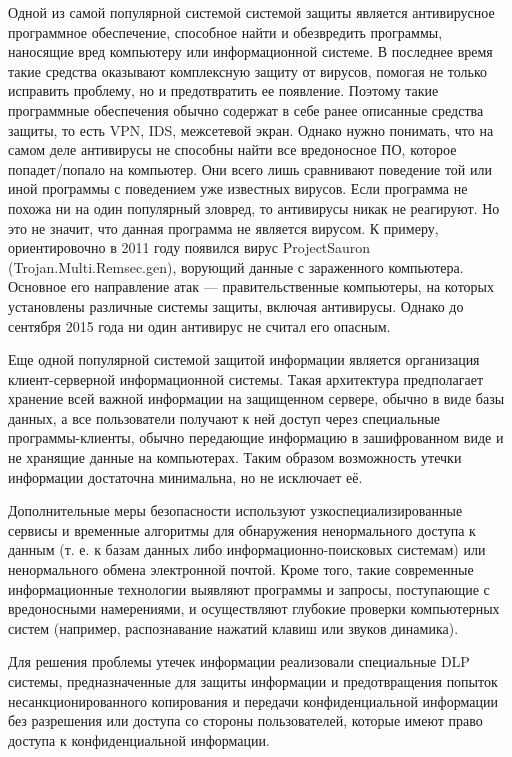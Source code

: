 Одной из самой популярной системой системой защиты является антивирусное программное обеспечение, способное найти и обезвредить программы, наносящие вред компьютеру или информационной системе. В последнее время такие средства оказывают комплексную защиту от вирусов, помогая не только исправить проблему, но и предотвратить ее появление. Поэтому такие программные обеспечения обычно содержат в себе ранее описанные средства защиты, то есть VPN, IDS, межсетевой экран. Однако нужно понимать, что на самом деле антивирусы не способны найти все вредоносное ПО, которое попадет/попало на компьютер. Они всего лишь сравнивают поведение той или иной программы с поведением уже известных вирусов. Если программа не похожа ни на один популярный зловред, то антивирусы никак не реагируют. Но это не значит, что данная программа не является вирусом. К примеру, ориентировочно в 2011 году появился вирус ProjectSauron (Trojan.Multi.Remsec.gen), ворующий данные с зараженного компьютера. Основное его направление атак --- правительственные компьютеры, на которых установлены различные системы защиты, включая антивирусы. Однако до сентября 2015 года ни один антивирус не считал его опасным.

Еще одной популярной системой защитой информации является организация клиент-серверной информационной системы. Такая архитектура предполагает хранение всей важной информации на защищенном сервере, обычно в виде базы данных, а все пользователи получают к ней доступ через специальные программы-клиенты, обычно передающие информацию в зашифрованном виде и не хранящие данные на компьютерах. Таким образом возможность утечки информации достаточна минимальна, но не исключает её.

Дополнительные меры безопасности используют узкоспециализированные сервисы и временные алгоритмы для обнаружения ненормального доступа к данным (т. е. к базам данных либо информационно-поисковых системам) или ненормального обмена электронной почтой. Кроме того, такие современные информационные технологии выявляют программы и запросы, поступающие с вредоносными намерениями, и осуществляют глубокие проверки компьютерных систем (например, распознавание нажатий клавиш или звуков динамика).


Для решения проблемы утечек информации реализовали специальные DLP системы, предназначенные для защиты информации и предотвращения попыток несанкционированного копирования и передачи конфиденциальной информации без разрешения или доступа со стороны пользователей, которые имеют право доступа к конфиденциальной информации.

